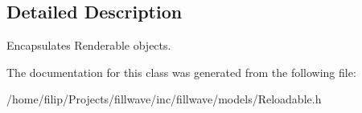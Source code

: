 \subsection{Detailed Description}
Encapsulates Renderable objects. 

The documentation for this class was generated from the following file\+:\begin{DoxyCompactItemize}
\item 
/home/filip/\+Projects/fillwave/inc/fillwave/models/Reloadable.\+h\end{DoxyCompactItemize}
